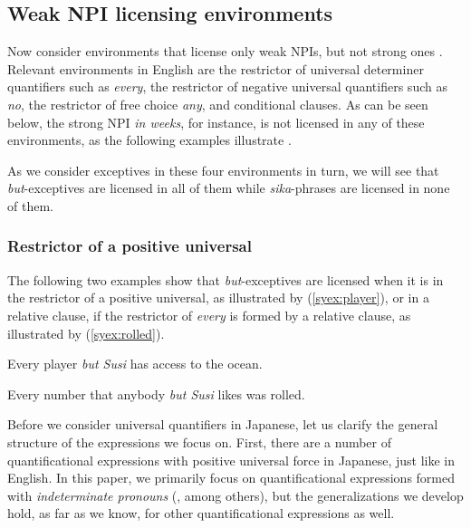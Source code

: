 \documentclass[output=paper]{langscibook}
\begin{document}
\subsection{Weak NPI licensing environments}

Now consider environments that license only weak NPIs, but not strong ones \citep{zwarts98a,gajewski11a}.
Relevant environments in English are the restrictor of universal determiner quantifiers such as \emph{every}, the restrictor of negative universal quantifiers such as \emph{no}, the restrictor of free choice \emph{any}, and conditional clauses.  
As can be seen below, the strong NPI \emph{in weeks}, for instance, is not licensed in any of these environments, as the following examples illustrate \citep{hoeksema05m}.

\ea {}
    \z
\z

As we consider exceptives in these four environments in turn, we will see that \emph{but}-exceptives are licensed in all of them while \emph{sika}-phrases are licensed in none of them.

\subsubsection{Restrictor of a positive universal}
The following two examples show that \emph{but}-exceptives are licensed when it is in the restrictor of a positive universal, as illustrated by (\ref{syex:player}), or in a relative clause, if the restrictor of \emph{every} is formed by a relative clause, as illustrated by (\ref{syex:rolled}).

\ea \label{syex:player} 
   Every player \emph{but Susi} has access to the ocean.

\ex \label{syex:rolled}
    Every number that anybody \emph{but Susi} likes was rolled.\z

\begin{sloppypar}
Before we consider universal quantifiers in Japanese, let us clarify the general structure of the expressions we focus on.
First, there are a number of quantificational expressions with positive universal force in Japanese, just like in English.
In this paper, we primarily focus on quantificational expressions formed with \emph{indeterminate pronouns}  (\citealt{nishigauchi90, shimoyama06, yatsushiro09b}, among others), but the generalizations we develop hold, as far as we know, for other quantificational expressions as well.
\end{sloppypar}
\end{document}
